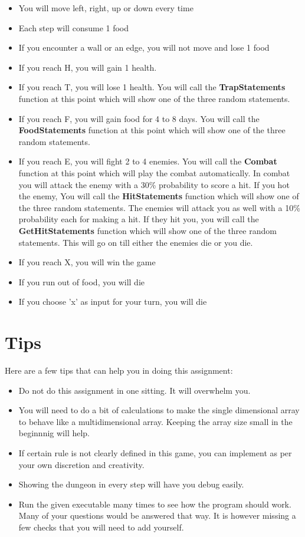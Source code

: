 \documentclass[a4paper,12pt]{article}
\begin{document}
	\begin{itemize}
		\item You will move left, right, up or down every time
		\item Each step will consume 1 food
		\item If you encounter a wall or an edge, you will not move and lose 1 food
		\item If you reach H, you will gain 1 health.
		\item If you reach T, you will lose 1 health. You will call the \textbf{TrapStatements} function at this point which will show one of the three random statements.
		\item If you reach F, you will gain food for 4 to 8 days. You will call the \textbf{FoodStatements} function at this point which will show one of the three random statements.
		\item If you reach E, you will fight 2 to 4 enemies. You will call the \textbf{Combat} function at this point which will play the combat automatically. In combat you will attack the enemy with a 30\% probability to score a hit. If you hot the enemy,  You will call the \textbf{HitStatements} function which will show one of the three random statements. The enemies will attack you as well with a 10\% probability each for making a hit. If they hit you, you will call the \textbf{GetHitStatements} function which will show one of the three random statements. This will go on till either the enemies die or you die.
		\item If you reach X, you will win the game
		\item If you run out of food, you will die
		\item If you choose 'x' as input for your turn, you will die
	\end{itemize}
	
	\section{Tips}
	Here are a few tips that can help you in doing this assignment:
	
	\begin{itemize}
		\item Do not do this assignment in one sitting. It will overwhelm you.
		\item You will need to do a bit of calculations to make the single dimensional array to behave like a multidimensional array. Keeping the array size small in the beginnnig will help.
		\item If certain rule is not clearly defined in this game, you can implement as per your own discretion and creativity.
		
		\item Showing the dungeon in every step will have you debug easily.
		\item Run the given executable many times to see how the program should work. Many of your questions would be answered that way. It is however missing a few checks that you will need to add yourself.
	\end{itemize}
	
\end{document}
